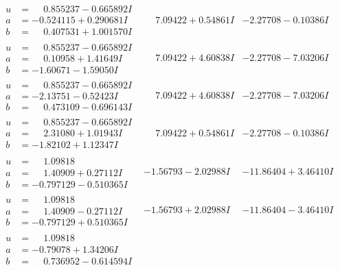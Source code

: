 \documentclass[1p]{elsarticle_modified}
\theoremstyle{definition}
\begin{document}
$$\begin{array}{c|c|c}
\begin{aligned}
u &= \phantom{-}0.855237 - 0.665892 I \\
a &= -0.524115 + 0.290681 I \\
b &= \phantom{-}0.407531 + 1.001570 I\end{aligned}
 & \phantom{-}7.09422 + 0.54861 I & -2.27708 - 0.10386 I \\ \hline\begin{aligned}
u &= \phantom{-}0.855237 - 0.665892 I \\
a &= \phantom{-}0.10958 + 1.41649 I \\
b &= -1.60671 - 1.59050 I\end{aligned}
 & \phantom{-}7.09422 + 4.60838 I & -2.27708 - 7.03206 I \\ \hline\begin{aligned}
u &= \phantom{-}0.855237 - 0.665892 I \\
a &= -2.13751 - 0.52423 I \\
b &= \phantom{-}0.473109 - 0.696143 I\end{aligned}
 & \phantom{-}7.09422 + 4.60838 I & -2.27708 - 7.03206 I \\ \hline\begin{aligned}
u &= \phantom{-}0.855237 - 0.665892 I \\
a &= \phantom{-}2.31080 + 1.01943 I \\
b &= -1.82102 + 1.12347 I\end{aligned}
 & \phantom{-}7.09422 + 0.54861 I & -2.27708 - 0.10386 I \\ \hline\begin{aligned}
u &= \phantom{-}1.09818\phantom{ +0.000000I} \\
a &= \phantom{-}1.40909 + 0.27112 I \\
b &= -0.797129 - 0.510365 I\end{aligned}
 & -1.56793 - 2.02988 I & -11.86404 + 3.46410 I \\ \hline\begin{aligned}
u &= \phantom{-}1.09818\phantom{ +0.000000I} \\
a &= \phantom{-}1.40909 - 0.27112 I \\
b &= -0.797129 + 0.510365 I\end{aligned}
 & -1.56793 + 2.02988 I & -11.86404 - 3.46410 I \\ \hline\begin{aligned}
u &= \phantom{-}1.09818\phantom{ +0.000000I} \\
a &= -0.79078 + 1.34206 I \\
b &= \phantom{-}0.736952 - 0.614594 I\end{aligned}

\end{array}$$
\end{document}
